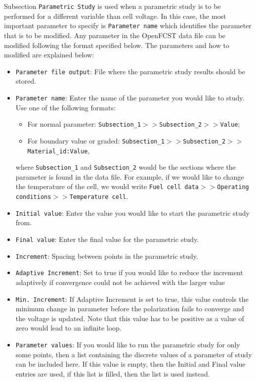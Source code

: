 Subsection \texttt{Parametric Study} is used when a parametric study is to be performed for a different variable than cell voltage. In this case, the most important parameter to specify is \texttt{Parameter name} which identifies the parameter that is to be modified. Any parameter in the OpenFCST data file can be modified following the format specified below. The parameters and how to modified are explained below:
\begin{itemize}
 \item \texttt{Parameter file output}: File where the parametric study results should be stored.
 \item \texttt{Parameter name}: Enter the name of the parameter you would like to study. Use one of the following formats:
 \begin{itemize}
   \item For normal parameter: \texttt{Subsection\_1$>>$Subsection\_2$>>$Value};
   \item For boundary value or graded: \texttt{Subsection\_1$>>$Subsection\_2$>>$Material\_id:Value},
 \end{itemize}
   where \texttt{Subsection\_1} and \texttt{Subsection\_2} would be the sections where the parameter is found in the data file. For example, if we would like to change the temperature of the cell, we would write \texttt{Fuel cell data$>>$Operating conditions$>>$Temperature cell}.
   \item \texttt{Initial value}: Enter the value you would like to start the parametric study from.
   \item \texttt{Final value}: Enter the final value for the parametric study.
   \item \texttt{Increment}: Spacing between points in the parametric study.
   \item \texttt{Adaptive Increment}: Set to true if you would like to reduce the increment adaptively if convergence could not be achieved with the larger value
   \item \texttt{Min.~Increment}: If Adaptive Increment is set to true, this value controls the minimum change in parameter before the polarization fails to converge and the voltage is updated. Note that this value has to be positive as a value of zero would lead to an infinite loop.
   \item \texttt{Parameter values}: If you would like to run the parametric study for only some points, then a list containing the discrete values of a parameter of study can be included here. If this value is empty, then the Initial and Final value entries are used, if this list is filled, then the list is used instead.
\end{itemize}

